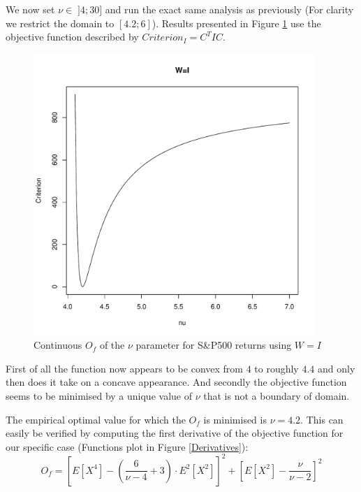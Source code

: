 We now set $\nu \in \; ]4;30]$ and run the exact same analysis as previously (For clarity we restrict the domain to $[4.2;6]$). Results presented in Figure \ref{ConcavitySPI} use the objective function described by $Criterion_I = C^T I C$.
\begin{figure}
    \centering
    \includegraphics[width=0.95\textwidth]{ConcavityS&PI.pdf}
    \caption{Continuous $O_f$ of the $\nu$ parameter for S\&P500 returns using $W=I$}
    \label{ConcavitySPI}
\end{figure}
\par
First of all the function now appears to be convex from $4$ to roughly $4.4$ and only then does it take on a concave appearance. And secondly the objective function seems to be minimised by a unique value of $\nu$ that is not a boundary of domain.
\par
The empirical optimal value for which the $O_f$ is minimised is $\nu=4.2$. 
This can easily be verified by computing the first derivative of the objective function for our specific case (Functions plot in Figure \ref{Derivatives}):
\begin{equation}\label{ObjectiveFunction_I}
    O_f = \left[E\left[X^4\right] - \left(\frac{6}{\nu-4}+3\right)\cdot         
                E^2\left[X^2\right]\right]^2 +
            \left[E\left[X^2\right] - \frac{\nu}{\nu - 2}\right]^2
\end{equation}

